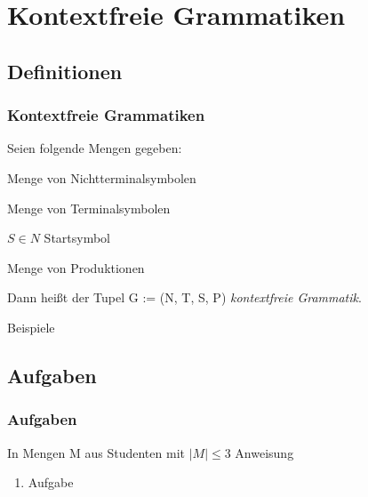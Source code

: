 \section{Kontextfreie Grammatiken}
\subsection{Definitionen}
\begin{frame}
  \frametitle{Kontextfreie Grammatiken}
  \begin{definition}
    \begin{description}{Seien folgende Mengen gegeben:}
      \item[N:] Menge von Nichtterminalsymbolen
      \item[T:] Menge von Terminalsymbolen
      \item[S:] $S \in N$ Startsymbol
      \item[$P \subset N \times (N \cup T)$:] Menge von Produktionen
    \end{description}
    Dann heißt der Tupel G := (N, T, S, P) \emph{kontextfreie Grammatik}.
  \end{definition}\pause
  \begin{exampleblock}{Beispiele}
    \begin{itemize}
    \end{itemize}
  \end{exampleblock}
\end{frame}

\subsection{Aufgaben}
\begin{frame}
  \frametitle{Aufgaben}
  \begin{exampleblock}{In Mengen M aus Studenten mit $|M| \leq 3$}
      Anweisung
      \begin{enumerate}
        \item Aufgabe
      \end{enumerate}
  \end{exampleblock}
\end{frame}
